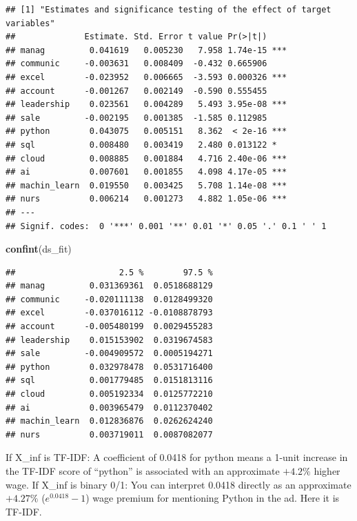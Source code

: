 \documentclass[
]{article}
\newenvironment{Shaded}{\begin{snugshade}}{\end{snugshade}}
\newcommand{\FunctionTok}[1]{\textcolor[rgb]{0.13,0.29,0.53}{\textbf{#1}}}
\newcommand{\NormalTok}[1]{#1}
\begin{document}
\begin{verbatim}
## [1] "Estimates and significance testing of the effect of target variables"
##              Estimate. Std. Error t value Pr(>|t|)    
## manag         0.041619   0.005230   7.958 1.74e-15 ***
## communic     -0.003631   0.008409  -0.432 0.665906    
## excel        -0.023952   0.006665  -3.593 0.000326 ***
## account      -0.001267   0.002149  -0.590 0.555455    
## leadership    0.023561   0.004289   5.493 3.95e-08 ***
## sale         -0.002195   0.001385  -1.585 0.112985    
## python        0.043075   0.005151   8.362  < 2e-16 ***
## sql           0.008480   0.003419   2.480 0.013122 *  
## cloud         0.008885   0.001884   4.716 2.40e-06 ***
## ai            0.007601   0.001855   4.098 4.17e-05 ***
## machin_learn  0.019550   0.003425   5.708 1.14e-08 ***
## nurs          0.006214   0.001273   4.882 1.05e-06 ***
## ---
## Signif. codes:  0 '***' 0.001 '**' 0.01 '*' 0.05 '.' 0.1 ' ' 1
\end{verbatim}

\begin{Shaded}
\begin{Highlighting}[]
\FunctionTok{confint}\NormalTok{(ds\_fit)}
\end{Highlighting}
\end{Shaded}

\begin{verbatim}
##                     2.5 %        97.5 %
## manag         0.031369361  0.0518688129
## communic     -0.020111138  0.0128499320
## excel        -0.037016112 -0.0108878793
## account      -0.005480199  0.0029455283
## leadership    0.015153902  0.0319674583
## sale         -0.004909572  0.0005194271
## python        0.032978478  0.0531716400
## sql           0.001779485  0.0151813116
## cloud         0.005192334  0.0125772210
## ai            0.003965479  0.0112370402
## machin_learn  0.012836876  0.0262624240
## nurs          0.003719011  0.0087082077
\end{verbatim}

If X\_inf is TF-IDF: A coefficient of 0.0418 for python means a 1-unit
increase in the TF-IDF score of ``python'' is associated with an
approximate \(+4.2\%\) higher wage. If X\_inf is binary 0/1: You can
interpret 0.0418 directly as an approximate \(+4.27\%\)
(\(e^{0.0418} - 1\)) wage premium for mentioning Python in the ad. Here
it is TF-IDF.
\end{document}

